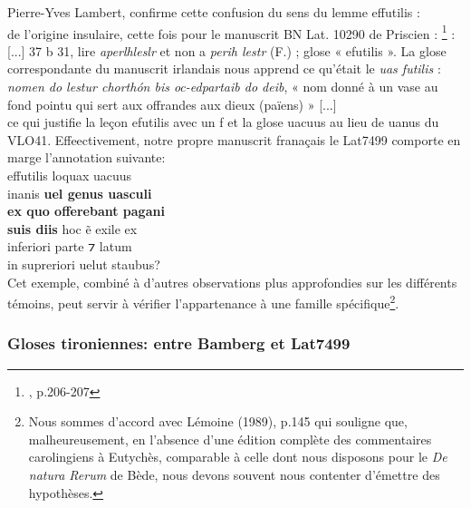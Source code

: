 \documentclass[a4paper, twoside, 12pt]{book}
\begin{document}
{Pierre-Yves Lambert, confirme cette confusion du sens du lemme \og{}effutilis \fg{}: \\

\og{} de l'origine insulaire, cette fois pour le manuscrit BN Lat. 10290 de Priscien :  \footnote{\cite{lambert1982gloses}, p.206-207} :
\og{} [...] 37 b 31, lire \textit{aperlhleslr} et non a \textit{perih lestr} (F.) ; glose « efutilis ». La glose correspondante du manuscrit irlandais nous apprend ce qu’était le \textit{uas futilis} : \textit{nomen do lestur chorthón bis oc-edpartaib do deib}, « nom donné à un vase au fond pointu qui sert aux offrandes aux dieux (païens) » [...]\fg{} \\


ce qui justifie la leçon \og{}efutilis\fg{} avec un \og{}f\fg{} et la glose \og{}uacuus\fg{} au lieu de \og{} uanus \fg{} du VLO41. Effeectivement, notre propre manuscrit \og{}franaçais\fg{} le Lat7499 comporte en marge l'annotation suivante: \\

\og{}  effutilis loquax uacuus \\
 inanis\textbf{ uel genus uasculi} \\
 \textbf{ex quo offerebant pagani} \\
\textbf{suis diis} hoc ẽ exile ex \\
inferiori parte ⁊ latum \\
 in supreriori uelut staubus?\fg{} \\
 
Cet exemple, combiné à d'autres observations plus approfondies sur les différents témoins, peut servir à vérifier l'appartenance à une famille spécifique\footnote{Nous sommes d'accord avec Lémoine (1989), p.145 qui souligne que, malheureusement, en l'absence d'une édition complète des commentaires carolingiens à Eutychès, comparable à celle dont nous disposons pour le \textit{De natura Rerum} de Bède, nous devons souvent nous contenter d'émettre des hypothèses.}.

\subsubsection{Gloses \og{}tironiennes\fg{}: entre Bamberg et Lat7499}

}
\end{document}
